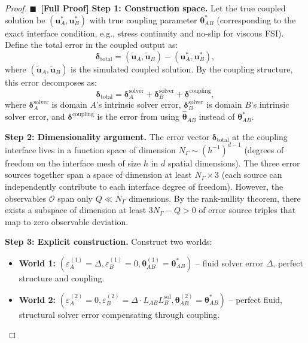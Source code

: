 \documentclass[11pt,a4paper]{article}
\theoremstyle{definition}
\newcommand{\rigorFull}[0]{$\blacksquare$~\textbf{[Full Proof]}}
\newcommand{\interface}{\Gamma}
\begin{document}
\begin{proof}\rigorFull
\textbf{Step 1: Construction space.} Let the true coupled solution be $(\mathbf{u}_A^*, \mathbf{u}_B^*)$ with true coupling parameter $\boldsymbol{\theta}_{AB}^*$ (corresponding to the exact interface condition, e.g., stress continuity and no-slip for viscous FSI). Define the total error in the coupled output as:
\begin{equation}
\boldsymbol{\delta}_{\mathrm{total}} = (\tilde{\mathbf{u}}_A, \tilde{\mathbf{u}}_B) - (\mathbf{u}_A^*, \mathbf{u}_B^*),
\end{equation}
where $(\tilde{\mathbf{u}}_A, \tilde{\mathbf{u}}_B)$ is the simulated coupled solution. By the coupling structure, this error decomposes as:
\begin{equation}\label{eq:error_decomp}
\boldsymbol{\delta}_{\mathrm{total}} = \boldsymbol{\delta}_A^{\mathrm{solver}} + \boldsymbol{\delta}_B^{\mathrm{solver}} + \boldsymbol{\delta}^{\mathrm{coupling}},
\end{equation}
where $\boldsymbol{\delta}_A^{\mathrm{solver}}$ is domain $A$'s intrinsic solver error, $\boldsymbol{\delta}_B^{\mathrm{solver}}$ is domain $B$'s intrinsic solver error, and $\boldsymbol{\delta}^{\mathrm{coupling}}$ is the error from using $\hat{\boldsymbol{\theta}}_{AB}$ instead of $\boldsymbol{\theta}_{AB}^*$.

\textbf{Step 2: Dimensionality argument.} The error vector $\boldsymbol{\delta}_{\mathrm{total}}$ at the coupling interface lives in a function space of dimension $N_\interface \sim (h^{-1})^{d-1}$ (degrees of freedom on the interface mesh of size $h$ in $d$ spatial dimensions). The three error sources together span a space of dimension at least $N_\interface \times 3$ (each source can independently contribute to each interface degree of freedom). However, the observables $\mathcal{O}$ span only $Q \ll N_\interface$ dimensions. By the rank-nullity theorem, there exists a subspace of dimension at least $3N_\interface - Q > 0$ of error source triples that map to zero observable deviation.

\textbf{Step 3: Explicit construction.} Construct two worlds:
\begin{itemize}
    \item \textbf{World 1:} $(\varepsilon_A^{(1)} = \Delta, \varepsilon_B^{(1)} = 0, \boldsymbol{\theta}_{AB}^{(1)} = \boldsymbol{\theta}_{AB}^*)$ -- fluid solver error $\Delta$, perfect structure and coupling.
    \item \textbf{World 2:} $(\varepsilon_A^{(2)} = 0, \varepsilon_B^{(2)} = \Delta \cdot L_{AB} L_B^{\mathrm{sol}}, \boldsymbol{\theta}_{AB}^{(2)} = \boldsymbol{\theta}_{AB}^*)$ -- perfect fluid, structural solver error compensating through coupling.
\end{itemize}


\end{proof}
\end{document}
